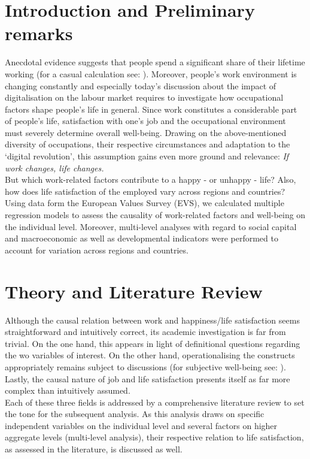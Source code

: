 \documentclass[preprint,12pt,authoryear]{elsarticle}
\begin{document}
\section{Introduction and Preliminary remarks}
Anecdotal evidence suggests that people spend a significant share of their lifetime working (for a casual calculation 
see: \citet{thompson_what_2016}). Moreover, people's work environment is changing constantly and especially today's 
discussion about the impact of digitalisation on the labour market requires to investigate how occupational factors shape 
people's life in general. Since work constitutes a considerable part of people’s life, satisfaction with one’s job and the
occupational environment must severely determine overall well-being. Drawing on the above-mentioned diversity of 
occupations, their respective circumstances and adaptation to the ‘digital revolution’, this assumption gains even more 
ground and relevance: \textit{If work changes, life changes.} \\
But which work-related factors contribute to a happy - or unhappy - life? Also, how does life satisfaction of the employed
vary across regions and countries? \\
Using data form the European Values Survey (EVS), we calculated multiple regression models to assess the causality of
work-related factors and well-being on the individual level. Moreover, multi-level analyses with regard to social capital and
macroeconomic as well as developmental indicators were performed to account for variation across regions and countries. 

\section{Theory and Literature Review}
Although the causal relation between work and happiness/life satisfaction seems straightforward and intuitively correct,
its academic investigation is far from trivial. On the one hand, this appears in light of definitional questions regarding the 
wo variables of interest. On the other hand, operationalising the constructs appropriately remains subject to discussions
(for subjective well-being see: \cite{kahneman_developments_2006,layard_measuring_2010}). Lastly, the causal nature of job and life
satisfaction presents itself as far more complex than intuitively assumed. \\
Each of these three fields is addressed by a comprehensive literature review to set the tone for the subsequent analysis.
As this analysis draws on specific independent variables on the individual level and several factors on higher aggregate
levels (multi-level analysis), their respective relation to life satisfaction, as assessed in the literature, is discussed as well.
\end{document}
